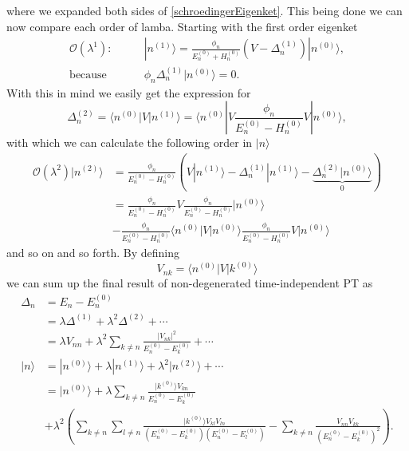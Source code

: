 where we expanded both sides of \ref{schroedingerEigenket}. This being done we can now compare each order of lamba. Starting with the first order eigenket
\begin{align}
	\mathcal{O}(\lambda^1): \qquad &|n^{(1)}\rangle = \frac{\phi_n}{E_n^{(0)} + H_n^{(0)}} (V - \Delta_n^{(1)} ) | n^{(0)} \rangle, \\
	\text{because} \quad &\phi_n \Delta_n^{(1)} | n^{(0)} \rangle = 0.
\end{align}
With this in mind we easily get the expression for 
\begin{equation}
	\Delta_n^{(2)} = \langle n^{(0)} | V | n^{(1)} \rangle = \langle n^{(0)} | V \frac{\phi_n}{E_n^{(0)} - H_n^{(0)}} V | n^{(0)} \rangle,
\end{equation}
with which we can calculate the following order in $|n\rangle$
\begin{align}
	\mathcal{O}(\lambda^2) |n^{(2)} \rangle &= \frac{\phi_n}{E_n^{(0)} - H_n^{(0)}} (V | n^{(1)} \rangle - \Delta_n^{(1)} | n^{(1)} \rangle - \underbrace{\Delta_n^{(2)} | n^{(0)} \rangle}_{0} ) \\
	&= \frac{\phi_n}{E_n^{(0)} - H_n^{(0)}} V \frac{\phi_n}{E_n^{(0)} - H_n^{(0)}} | n^{(0)}\rangle \\
	&- \frac{\phi_n}{E_n^{(0)} - H_n^{(0)}} \langle n^{(0)}|V|n^{(0)}\rangle \frac{\phi_n}{E_n^{(0)} - H_n^{(0)}} V | n^{(0)}\rangle
\end{align}
and so on and so forth. By defining
\begin{equation}
	V_{nk} = \langle n^{(0)}|V|k^{(0)}\rangle
\end{equation}
we can sum up the final result of non-degenerated time-independent PT as
\begin{align}
	\Delta_n &= E_n - E_n^{(0)} \\
	&= \lambda \Delta^{(1)} + \lambda^2 \Delta^{(2)} + \cdots \\
	&= \lambda V_{nn} + \lambda^2 \sum_{k \neq n} \frac{|V_{nk}|^2}{E_n^{(0)} - E_k^{(0)}} + \cdots \\
	|n\rangle &= |n^{(0)}\rangle + \lambda |n^{(1)}\rangle + \lambda^2|n^{(2)}\rangle + \cdots \\
	&= |n^{(0)}\rangle + \lambda \sum_{k\neq n} \frac{|k^{(0)}\rangle V_{kn}}{E_n^{(0)}-E_k^{(0)}} \\
	&+ \lambda^2 \left( \sum_{k\neq n}\sum_{l\neq n} \frac{|k^{(0)}\rangle V_{kl}V_{ln}}{(E_n^{(0)}-E_k^{(0)})(E_n^{(0)}-E_l^{(0)})} - \sum_{k\neq n} \frac{V_{nn}V_{kk}}{(E_n^{(0)} - E_k^{(0)})^2} \right).
\end{align}



